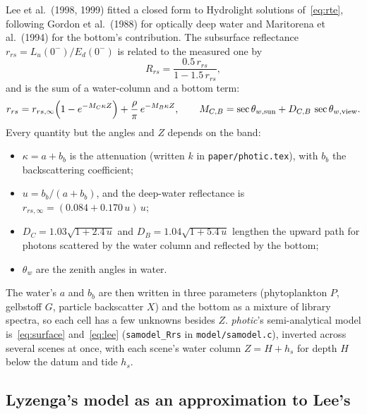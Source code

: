 \documentclass[11pt]{article}
\numberwithin{equation}{section}
\newcommand{\code}[1]{\texttt{#1}}
\begin{document}
Lee et al.\ (1998, 1999) fitted a closed form to Hydrolight solutions of~\eqref{eq:rte}, following
Gordon et al.\ (1988) for optically deep water and Maritorena et al.\ (1994) for the bottom's
contribution. The subsurface reflectance $r_{rs} = L_u(0^-)/E_d(0^-)$ is related to the measured
one by
\begin{equation}
  R_{rs} = \frac{0.5\, r_{rs}}{1 - 1.5\, r_{rs}} ,
  \label{eq:surface}
\end{equation}
and is the sum of a water-column and a bottom term:
\begin{equation}
  r_{rs} = r_{rs,\infty}\Bigl(1 - e^{-M_C \kappa Z}\Bigr) + \frac{\rho}{\pi}\, e^{-M_B \kappa Z},
  \qquad
  M_{C,B} = \sec\theta_{w,\mathrm{sun}} + D_{C,B}\, \sec\theta_{w,\mathrm{view}} .
  \label{eq:lee}
\end{equation}
Every quantity but the angles and $Z$ depends on the band:
\begin{itemize}
\item $\kappa = a + b_b$ is the attenuation (written $k$ in \code{paper/photic.tex}), with $b_b$
  the backscattering coefficient;
\item $u = b_b/(a + b_b)$, and the deep-water reflectance is $r_{rs,\infty} = (0.084 + 0.170\,u)\,u$;
\item $D_C = 1.03\sqrt{1 + 2.4\,u}$ and $D_B = 1.04\sqrt{1 + 5.4\,u}$ lengthen the upward path for
  photons scattered by the water column and reflected by the bottom;
\item $\theta_w$ are the zenith angles in water.
\end{itemize}
The water's $a$ and $b_b$ are then written in three parameters (phytoplankton $P$, gelbstoff $G$,
particle backscatter $X$) and the bottom as a mixture of library spectra, so each cell has a few
unknowns besides $Z$. \textit{photic}'s semi-analytical model is~\eqref{eq:surface}
and~\eqref{eq:lee} (\code{samodel\_Rrs} in \code{model/samodel.c}), inverted across several scenes
at once, with each scene's water column $Z = H + h_s$ for depth $H$ below the datum and tide $h_s$.

\subsection{Lyzenga's model as an approximation to Lee's}
\label{sec:lee2lyz}
\end{document}
